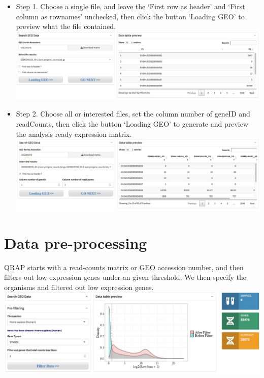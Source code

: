\documentclass[
  a4paper,
  oneside]{book}
\providecommand{\tightlist}{%
  \setlength{\itemsep}{0pt}\setlength{\parskip}{0pt}}
\begin{document}
\begin{itemize}
\tightlist
\item
  Step 1. Choose a single file, and leave the `First row as header' and `First column as rownames' unchecked, then click the button `Loading GEO' to preview what the file contained.\\
  \includegraphics{images/geo_preview_multiple_setp1.jpeg}
\item
  Step 2. Choose all or interested files, set the column number of geneID and readCounts, then click the button `Loading GEO' to generate and preview the analysis ready expression matrix.\\
  \includegraphics{images/geo_preview_multiple_setp2.jpeg}
\end{itemize}

\hypertarget{data-pre-processing}{%
\section{Data pre-processing}\label{data-pre-processing}}

QRAP starts with a read-counts matrix or GEO accession number, and then filters out low expression genes under an given threshold. We then specify the organisms and filtered out low expression genes.\\
\includegraphics{images/prefiltering.jpeg}
\end{document}
